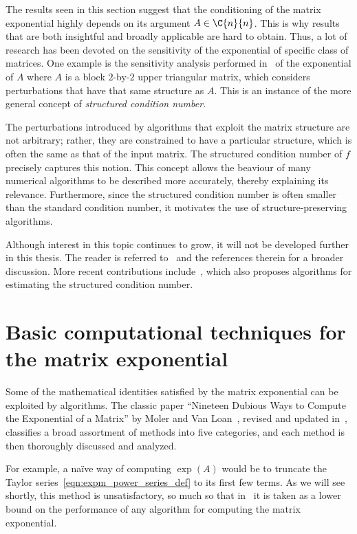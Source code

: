 The results seen in this section suggest that the conditioning of the matrix exponential highly depends on its argument $A\in\C{n}{n}$. This is why results that are both insightful and broadly applicable are hard to obtain. Thus, a lot of research has been devoted on the sensitivity of the exponential of specific class of matrices. One example is the sensitivity analysis performed in~\cite{dieci_papini:cond_2001} of the exponential of $A$ where $A$ is a block $2$-by-$2$ upper triangular matrix, which considers perturbations that have that same structure as $A$. This is an instance of the more general concept of \emph{structured condition number}.

The perturbations introduced by algorithms that exploit the matrix structure are not arbitrary; rather, they are constrained to have a particular structure, which is often the same as that of the input matrix. The structured condition number of $f$ precisely captures this notion. This concept allows the beaviour of many numerical algorithms to be described more accurately, thereby explaining its relevance. Furthermore, since the structured condition number is often smaller than the standard condition number, it motivates the use of structure-preserving algorithms. 

Although interest in this topic continues to grow, it will not be developed further in this thesis. The reader is referred to~\cite[§~14.1]{higham:matfun_book} and the references therein for a broader discussion. More recent contributions include~\cite{noferini:struct_cond_n}, which also proposes algorithms for estimating the structured condition number.


\section{Basic computational techniques for the matrix exponential}\label{sect:comp_methods_expm}
Some of the mathematical identities satisfied by the matrix exponential can be exploited by algorithms. The classic paper ``Nineteen Dubious Ways to Compute the Exponential of a Matrix'' by Moler and Van Loan~\cite{moler_vanloan:19_dubious_ways}, revised and updated in~\cite{moler_vanloan:19_dubious_ways_25yrs}, classifies a broad assortment of methods into five categories, and each method is then thoroughly discussed and analyzed. 

For example, a na\"ive way of computing $\exp(A)$ would be to truncate the Taylor series~\eqref{eqn:expm_power_series_def} to its first few terms. As we will see shortly, this method is unsatisfactory, so much so that in~\cite{moler_vanloan:19_dubious_ways, moler_vanloan:19_dubious_ways_25yrs} it is taken as a lower bound on the performance of any algorithm for computing the matrix exponential.

